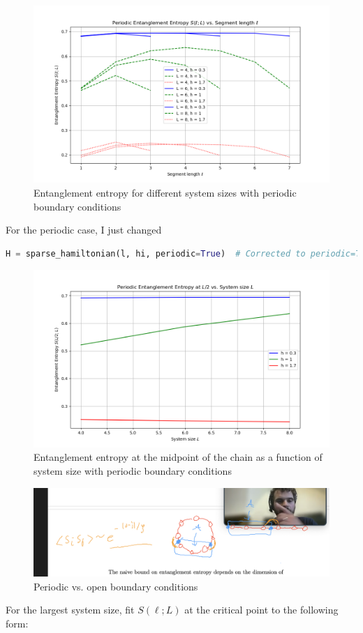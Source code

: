 \documentclass[12pt]{article}
\begin{document}
\begin{figure}
\centering
\includegraphics[width=\textwidth]{entanglement_entropy_periodic.png}
\caption{Entanglement entropy for different system sizes with periodic boundary conditions}
\end{figure}
For the periodic case, I just changed
\begin{lstlisting}[language=Python]
H = sparse_hamiltonian(l, hi, periodic=True)  # Corrected to periodic=True as needed
\end{lstlisting}
\begin{figure}
\centering
\includegraphics[width=\textwidth]{entanglement_entropy_L2_periodic.png}
\caption{Entanglement entropy at the midpoint of the chain as a function of system size with periodic boundary conditions}
\end{figure}
\begin{figure}
\centering
\includegraphics[width=\textwidth]{pbc.png}
\caption{Periodic vs. open boundary conditions}
\end{figure}
\newpage
For the largest system size, fit $S(\ell ; L)$ at the critical point to the following form:
\end{document}
